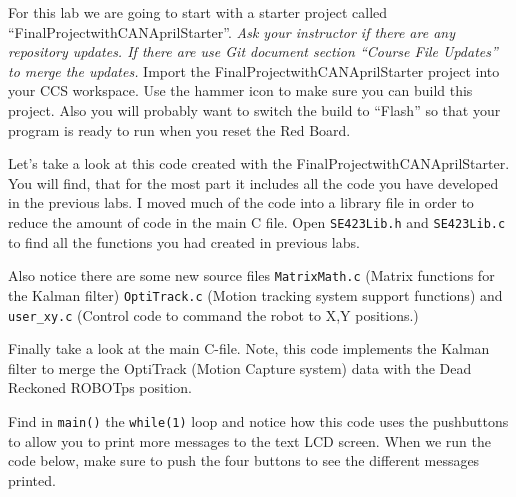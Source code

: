 \documentclass[11pt]{article}
\begin{document}

For this lab we are going to start with a starter project called “FinalProjectwithCANAprilStarter”. \textit{Ask your instructor if there are any repository updates. If there are use Git document section “Course File Updates” to merge the updates.} Import the FinalProjectwithCANAprilStarter project into your CCS workspace. Use the hammer icon to make sure you can build this project. Also you will probably want to switch the build to “Flash” so that your program is ready to run when you reset the Red Board.

Let’s take a look at this code created with the FinalProjectwithCANAprilStarter. You will find, that for the most part it includes all the code you have developed in the previous labs. I moved much of the code into a library file in order to reduce the amount of code in the main C file. Open \texttt{SE423Lib.h} and \texttt{SE423Lib.c} to find all the functions you had created in previous labs.

Also notice there are some new source files \texttt{MatrixMath.c} (Matrix functions for the Kalman filter) \texttt{OptiTrack.c} (Motion tracking system support functions) and \texttt{user\_xy.c} (Control code to command the robot to X,Y positions.)

Finally take a look at the main C-file. Note, this code implements the Kalman filter to merge the OptiTrack (Motion Capture system) data with the Dead Reckoned ROBOTps position.

Find in \texttt{main()} the \texttt{while(1)} loop and notice how this code uses the pushbuttons to allow you to print more messages to the text LCD screen. When we run the code below, make sure to push the four buttons to see the different messages printed.
\end{document}
